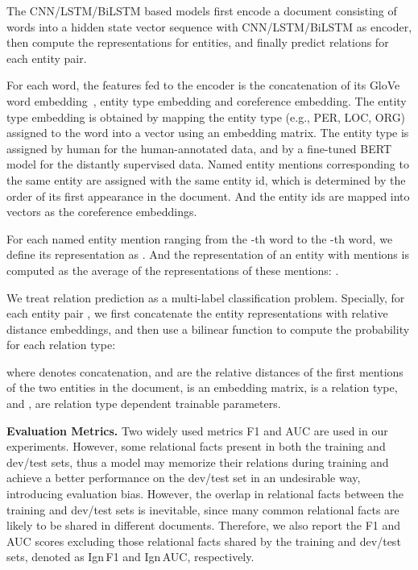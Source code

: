 \documentclass[11pt,a4paper]{article}
\begin{document}
The CNN/LSTM/BiLSTM based models first encode a document  consisting of  words into a hidden state vector sequence  with CNN/LSTM/BiLSTM as encoder, then compute the representations for entities, and finally predict relations for each entity pair.

For each word,  the features fed to the encoder is the concatenation of its GloVe word embedding~\cite{DBLP:conf/emnlp/PenningtonSM14}, entity type embedding and coreference embedding. The entity type embedding is obtained by mapping the entity type (e.g., PER, LOC, ORG) assigned to the word into a vector using an embedding matrix. The entity type is assigned by human for the human-annotated data, and by a fine-tuned BERT model for the distantly supervised data. 
Named entity mentions corresponding to the same entity are assigned with the same entity id, which is determined by the order of its first appearance in the document. And the entity ids are mapped into vectors as the coreference embeddings.

For each named entity mention  ranging from the -th word to the -th word, we define its representation as . And the representation of an entity  with  mentions is computed as the average of the representations of these mentions: .

We treat relation prediction as a multi-label classification problem. Specially, for each entity pair , we first concatenate the entity representations with relative distance embeddings, and then use a bilinear function to compute the probability for each relation type:

where  denotes concatenation,  and  are the relative distances of the first mentions of the two entities in the document,  is an embedding matrix,   is a relation type, and ,  are relation type dependent trainable parameters.

\smallskip
\noindent
\textbf{Evaluation Metrics.}
Two widely used metrics F1 and AUC are used in our experiments. However, some relational facts present in both the training and dev/test sets, thus a model may memorize their relations during training and achieve a better performance on the dev/test set in an undesirable way, introducing evaluation bias. However, the overlap in relational facts between the training and dev/test sets is inevitable, since many common relational facts are likely to be shared in different documents. Therefore, we also report the F1 and AUC scores excluding those relational facts shared by the training and dev/test sets, denoted as Ign\,F1 and Ign\,AUC, respectively. 
\end{document}
